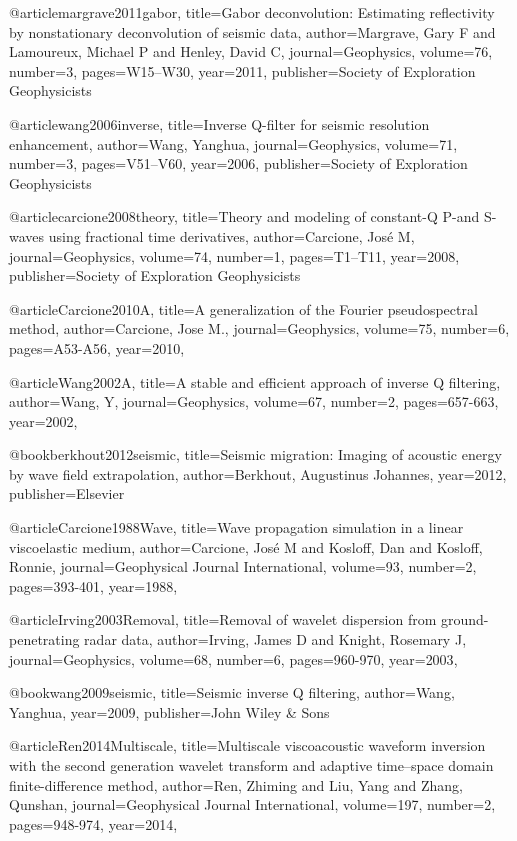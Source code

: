 {@article{margrave2011gabor,
  title={Gabor deconvolution: Estimating reflectivity by nonstationary deconvolution of seismic data},
  author={Margrave, Gary F and Lamoureux, Michael P and Henley, David C},
  journal={Geophysics},
  volume={76},
  number={3},
  pages={W15--W30},
  year={2011},
  publisher={Society of Exploration Geophysicists}
}

@article{wang2006inverse,
  title={Inverse {Q}-filter for seismic resolution enhancement},
  author={Wang, Yanghua},
  journal={Geophysics},
  volume={71},
  number={3},
  pages={V51--V60},
  year={2006},
  publisher={Society of Exploration Geophysicists}
}

@article{carcione2008theory,
  title={Theory and modeling of constant-{Q} {P}-and {S}-waves using fractional time derivatives},
  author={Carcione, Jos{\'e} M},
  journal={Geophysics},
  volume={74},
  number={1},
  pages={T1--T11},
  year={2008},
  publisher={Society of Exploration Geophysicists}
}


@article{Carcione2010A,
  title={A generalization of the Fourier pseudospectral method},
  author={Carcione, Jose M.},
  journal={Geophysics},
  volume={75},
  number={6},
  pages={A53-A56},
  year={2010},
}

@article{Wang2002A,
  title={A stable and efficient approach of inverse {Q} filtering},
  author={Wang, Y},
  journal={Geophysics},
  volume={67},
  number={2},
  pages={657-663},
  year={2002},
}

@book{berkhout2012seismic,
  title={Seismic migration: Imaging of acoustic energy by wave field extrapolation},
  author={Berkhout, Augustinus Johannes},
  year={2012},
  publisher={Elsevier}
}

@article{Carcione1988Wave,
  title={Wave propagation simulation in a linear viscoelastic medium},
  author={Carcione, José M and Kosloff, Dan and Kosloff, Ronnie},
  journal={Geophysical Journal International},
  volume={93},
  number={2},
  pages={393-401},
  year={1988},
}

@article{Irving2003Removal,
  title={Removal of wavelet dispersion from ground-penetrating radar data},
  author={Irving, James D and Knight, Rosemary J},
  journal={Geophysics},
  volume={68},
  number={6},
  pages={960-970},
  year={2003},
}

@book{wang2009seismic,
  title={Seismic inverse {Q} filtering},
  author={Wang, Yanghua},
  year={2009},
  publisher={John Wiley \& Sons}
}

@article{Ren2014Multiscale,
  title={Multiscale viscoacoustic waveform inversion with the second generation wavelet transform and adaptive time–space domain finite-difference method},
  author={Ren, Zhiming and Liu, Yang and Zhang, Qunshan},
  journal={Geophysical Journal International},
  volume={197},
  number={2},
  pages={948-974},
  year={2014},
}

}
